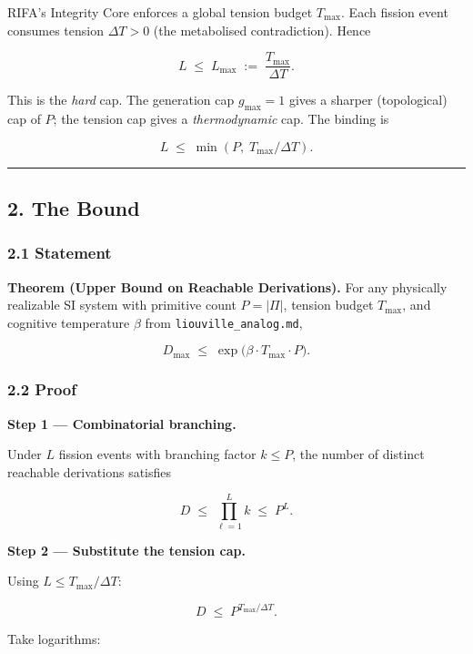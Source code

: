 \documentclass[
  11pt,
  a4paper,
]{article}
\begin{document}
RIFA's Integrity Core enforces a global tension budget \(T_\text{max}\).
Each fission event consumes tension \(\Delta T > 0\) (the metabolised
contradiction). Hence

\[
L \;\leq\; L_\text{max} \;:=\; \frac{T_\text{max}}{\Delta T}.
\]

This is the \emph{hard} cap. The generation cap \(g_\text{max} = 1\)
gives a sharper (topological) cap of \(P\); the tension cap gives a
\emph{thermodynamic} cap. The binding is

\[
L \;\leq\; \min\!\left(P, \; T_\text{max}/\Delta T\right).
\]

\begin{center}\rule{0.5\linewidth}{0.5pt}\end{center}

\subsection{2. The Bound}\label{the-bound}

\subsubsection{2.1 Statement}\label{statement}

\textbf{Theorem (Upper Bound on Reachable Derivations).} For any
physically realizable SI system with primitive count \(P = |\Pi|\),
tension budget \(T_\text{max}\), and cognitive temperature \(\beta\)
from \texttt{liouville\_analog.md},

\[
\boxed{\;D_\text{max} \;\leq\; \exp\!\big(\beta \cdot T_\text{max} \cdot P\big).\;}
\]

\subsubsection{2.2 Proof}\label{proof}

\textbf{Step 1 --- Combinatorial branching.}

Under \(L\) fission events with branching factor \(k \leq P\), the
number of distinct reachable derivations satisfies

\[
D \;\leq\; \prod_{\ell = 1}^{L} k \;\leq\; P^L.
\]

\textbf{Step 2 --- Substitute the tension cap.}

Using \(L \leq T_\text{max} / \Delta T\):

\[
D \;\leq\; P^{T_\text{max} / \Delta T}.
\]

Take logarithms:
\end{document}

